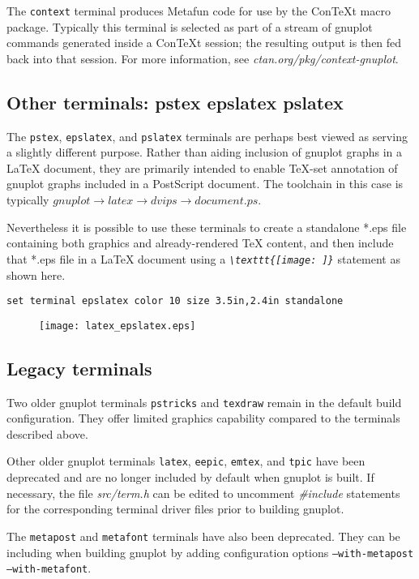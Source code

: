 \documentclass[letterpaper,11pt]{article}
\begin{document}
The {\tt context} terminal produces Metafun code for use by the 
ConTeXt macro package. Typically this terminal is selected as part of a stream
of gnuplot commands generated inside a ConTeXt session; the resulting output
is then fed back into that session.
For more information, see {\em ctan.org/pkg/context-gnuplot}.

\newpage

\subsection*{Other terminals: pstex epslatex pslatex}

The {\tt pstex}, {\tt epslatex}, and {\tt pslatex} terminals are perhaps
best viewed as serving a slightly different purpose.
Rather than aiding inclusion of gnuplot graphs in a {\LaTeX} document,
they are primarily intended to enable {\TeX}-set annotation of gnuplot graphs
included in a PostScript document.  The toolchain in this case is typically
{$ gnuplot \rightarrow latex \rightarrow dvips \rightarrow document.ps$}.

Nevertheless it is possible to use these terminals to create a standalone
*.eps file containing both graphics and already-rendered {\TeX} content,
and then include that *.eps file in a {\LaTeX} document using a
{\em {\verb+\texttt{[image: ]}+}} statement as shown here.

\begin{verbatim}
set terminal epslatex color 10 size 3.5in,2.4in standalone
\end{verbatim}

\begin{figure}[H]
   \centering
   \texttt{[image: latex\_epslatex.eps]}
\end{figure}


\subsection*{Legacy terminals}

Two older gnuplot terminals {\tt pstricks} and {\tt texdraw} remain in the
default build configuration.  They offer limited graphics capability
compared to the terminals described above.

Other older gnuplot terminals {\tt latex}, {\tt eepic}, {\tt emtex}, and {\tt tpic}
have been deprecated and are no longer included by default when gnuplot is built.
If necessary, the file {\em src/term.h} can be edited to uncomment {\em \#include}
statements for the corresponding terminal driver files prior to building gnuplot.

The {\tt metapost} and {\tt metafont} terminals have also been deprecated.
They can be including when building gnuplot by adding configuration options
{\tt --with-metapost --with-metafont}.
\end{document}
